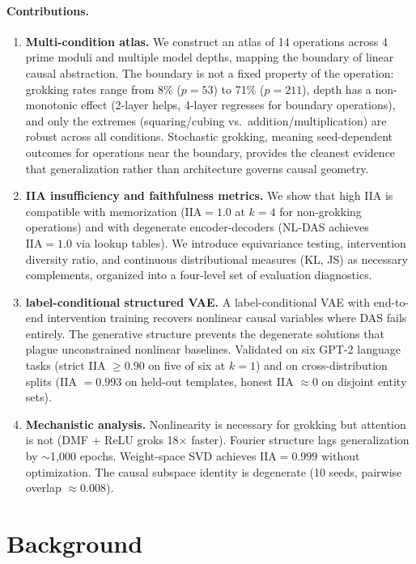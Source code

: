 \documentclass{article}
\newcommand{\IIA}{\mathrm{IIA}}
\begin{document}
\paragraph{Contributions.}
\begin{enumerate}[leftmargin=*]
\item \textbf{Multi-condition atlas.} We construct an atlas of 14 operations
  across 4 prime moduli and multiple model depths,
  mapping the boundary of linear causal abstraction. The boundary is not a
  fixed property of the operation: grokking rates range from 8\% ($p{=}53$)
  to 71\% ($p{=}211$), depth has a non-monotonic effect (2-layer helps,
  4-layer regresses for boundary operations), and only the
  extremes (squaring/cubing vs.\ addition/multiplication) are robust across
  all conditions. Stochastic grokking, meaning seed-dependent outcomes for operations near the
boundary, provides the cleanest evidence that generalization rather than
architecture governs causal geometry.
\item \textbf{IIA insufficiency and faithfulness metrics.} We show that
  high IIA is compatible with memorization ($\IIA = 1.0$ at $k{=}4$ for
  non-grokking operations) and with degenerate encoder-decoders (NL-DAS
  achieves $\IIA = 1.0$ via lookup tables). We introduce equivariance
  testing, intervention diversity ratio, and continuous distributional
  measures (KL, JS) as necessary complements, organized into a four-level
  set of evaluation diagnostics.
\item \textbf{label-conditional structured VAE.} A label-conditional VAE
  with end-to-end intervention training recovers nonlinear causal
  variables where DAS fails entirely. The generative structure prevents
  the degenerate solutions that plague unconstrained nonlinear baselines.
  Validated on six GPT-2 language tasks (strict IIA $\geq 0.90$ on five
  of six at $k{=}1$) and on cross-distribution splits (IIA $= 0.993$ on
  held-out templates, honest IIA $\approx 0$ on disjoint entity sets).
\item \textbf{Mechanistic analysis.} Nonlinearity is necessary for grokking
  but attention is not (DMF + ReLU groks 18$\times$ faster). Fourier
  structure lags generalization by $\sim$1{,}000 epochs. Weight-space SVD
  achieves $\IIA = 0.999$ without optimization. The causal subspace identity
  is degenerate (10 seeds, pairwise overlap $\approx 0.008$).
\end{enumerate}


\section{Background}
\label{sec:background}
\end{document}
